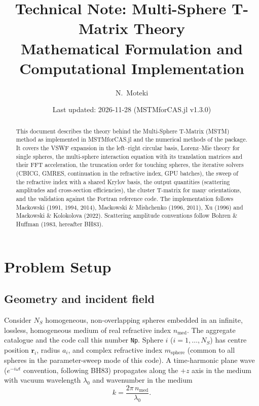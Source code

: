 \documentclass[11pt,a4paper]{article}
\title{Technical Note: Multi-Sphere T-Matrix Theory\\[4pt]
\large Mathematical Formulation and Computational Implementation}
\author{N.\ Moteki}
\date{Last updated: 2026-11-28 (MSTMforCAS.jl v1.3.0)}
\begin{document}
\maketitle

\begin{abstract}
This document describes the theory behind the Multi-Sphere T-Matrix (MSTM) method as implemented in MSTMforCAS.jl and the numerical methods of the package.
It covers the VSWF expansion in the left--right circular basis, Lorenz--Mie theory for single spheres, the multi-sphere interaction equation with its translation matrices and their FFT acceleration, the truncation order for touching spheres, the iterative solvers (CBICG, GMRES, continuation in the refractive index, GPU batches), the sweep of the refractive index with a shared Krylov basis, the output quantities (scattering amplitudes and cross-section efficiencies), the cluster T-matrix for many orientations, and the validation against the Fortran reference code.
The implementation follows Mackowski (1991, 1994, 2014), Mackowski \& Mishchenko (1996, 2011), Xu (1996) and Mackowski \& Kolokolova (2022).
Scattering amplitude conventions follow Bohren \& Huffman (1983, hereafter BH83).
\end{abstract}

\tableofcontents

\section{Problem Setup}
\label{sec:problem-setup}

\subsection{Geometry and incident field}

Consider $N_S$ homogeneous, non-overlapping spheres embedded in an infinite, lossless, homogeneous medium of real refractive index $n_\mathrm{med}$.
The aggregate catalogue and the code call this number \texttt{Np}.
Sphere $i$ ($i = 1, \dots, N_S$) has centre position $\bm{r}_i$, radius $a_i$, and complex refractive index $m_\mathrm{sphere}$ (common to all spheres in the parameter-sweep mode of this code).
A time-harmonic plane wave ($e^{-i\omega t}$ convention, following BH83) propagates along the $+z$ axis in the medium with vacuum wavelength $\lambda_0$ and wavenumber in the medium
\begin{equation}
  k = \frac{2\pi \, n_\mathrm{med}}{\lambda_0}.
  \label{eq:wavenumber}
\end{equation}
\end{document}
